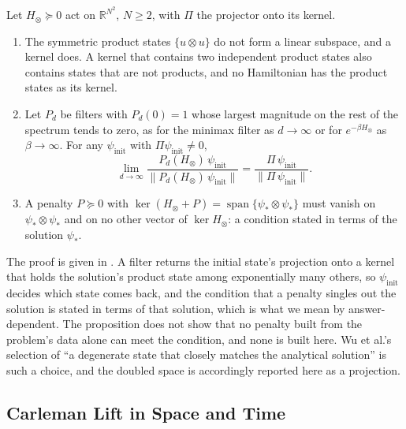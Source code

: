 \begin{proposition}
\label{prop:no-penalty}
Let $H_\otimes\succeq0$ act on $\mathbb{R}^{N^2}$, $N\ge2$, with $\Pi$ the projector onto its kernel.
\begin{enumerate}
    \item The symmetric product states $\{u\otimes u\}$ do not form a linear subspace, and a kernel does. A kernel that contains two independent product states also contains states that are not products, and no Hamiltonian has the product states as its kernel.
    \item Let $P_d$ be filters with $P_d(0)=1$ whose largest magnitude on the rest of the spectrum tends to zero, as for the minimax filter as $d\to\infty$ or for $e^{-\beta H_\otimes}$ as $\beta\to\infty$. For any $\psi_{\mathrm{init}}$ with $\Pi\psi_{\mathrm{init}}\ne0$,
    \begin{equation}
        \lim_{d\to\infty}\frac{P_d(H_\otimes)\,\psi_{\mathrm{init}}}{\bigl\|P_d(H_\otimes)\,\psi_{\mathrm{init}}\bigr\|}
        =\frac{\Pi\,\psi_{\mathrm{init}}}{\bigl\|\Pi\,\psi_{\mathrm{init}}\bigr\|}.
        \label{eq:doubled-projection}
    \end{equation}
    \item A penalty $P\succeq0$ with $\ker(H_\otimes+P)=\operatorname{span}\{\psi_*\otimes\psi_*\}$ must vanish on $\psi_*\otimes\psi_*$ and on no other vector of $\ker H_\otimes$: a condition stated in terms of the solution $\psi_*$.
\end{enumerate}
\end{proposition}
The proof is given in . A filter returns the initial state's projection onto a kernel that holds the solution's product state among exponentially many others, so $\psi_{\mathrm{init}}$ decides which state comes back, and the condition that a penalty singles out the solution is stated in terms of that solution, which is what we mean by answer-dependent. The proposition does not show that no penalty built from the problem's data alone can meet the condition, and none is built here. Wu et al.'s selection of ``a degenerate state that closely matches the analytical solution'' \cite{wu2025pihm} is such a choice, and the doubled space is accordingly reported here as a projection.

\subsection{Carleman Lift in Space and Time}
\label{sec:carleman}


